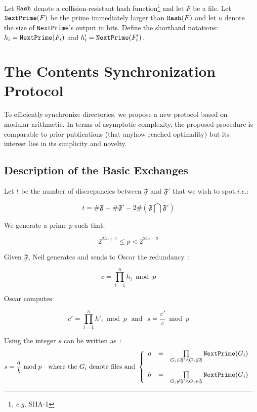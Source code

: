 \documentclass[11pt]{llncs}
\begin{document}
Let $\mbox{{\tt Hash}}$ denote a collision-resistant hash function\footnote{{\sl e.g.} SHA-1} and let $F$ be a file. Let $\mbox{{\tt NextPrime}}(F)$ be the prime immediately larger than $\mbox{{\tt Hash}}(F)$ and let $u$ denote the size of {\tt NextPrime}'s output in bits. Define the shorthand notations: $h_i=\mbox{{\tt NextPrime}}(F_i)$ and $h'_i=\mbox{{\tt NextPrime}}(F'_i)$.\smallskip

\section{The Contents Synchronization Protocol}

To efficiently synchronize directories, we propose a new protocol based on modular arithmetic. In terms of asymptotic complexity, the proposed procedure is comparable to prior publications \cite{} (that anyhow reached optimality) but its interest lies in its simplicity and novelty.\smallskip

\subsection{Description of the Basic Exchanges}

Let $t$ be the number of discrepancies between $\mathfrak{F}$ and $\mathfrak{F}'$ that we wish to spot.{\sl i.e.}:

$$t=\#\mathfrak{F}+\#\mathfrak{F}'-2 \#(\mathfrak{F} \bigcap \mathfrak{F}')$$

We generate a prime $p$ such that:

\begin{equation}
\label{equp}
2^{2tu+1} \leq p < 2^{2tu+2}
\end{equation}

Given $\mathfrak{F}$, Neil generates and sends to Oscar the redundancy~:

\begin{equation}
c=\prod_{i=1}^n h_i \bmod p
\end{equation}

Oscar computes:\smallskip

$$c'=\prod_{i=1}^n h'_i \bmod p{~~~\mbox{and}~~~}s=\frac{c'}{c} \bmod p$$

Using \cite{vallee} the integer $s$ can be written as~:
$$s=\frac{a}{b} \bmod p{~~~\mbox{where the~}G_i\mbox{~denote files and~}}
\left\{
\begin{array}{lcr}
a & =&  \prod\limits_{G_i \in \mathfrak{F}'\wedge G_i \not\in\mathfrak{F}} \mbox{{\tt NextPrime}}(G_i) \\
\\
b & = & \prod\limits_{G_i \not\in\mathfrak{F}' \wedge G_i \in\mathfrak{F}} \mbox{{\tt NextPrime}}(G_i)
\end{array}
\right.
$$
\end{document}
